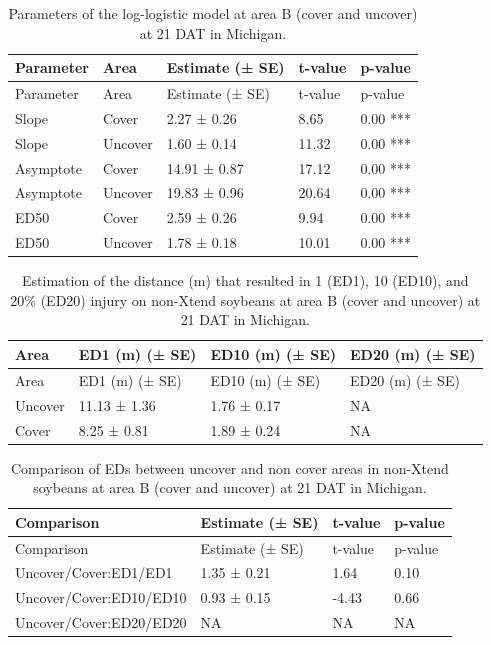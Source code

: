 \documentclass[]{article}
\begin{document}
\begin{longtable}[]{@{}lllll@{}}
\caption{Parameters of the log-logistic model at area B (cover and
uncover) at 21 DAT in Michigan.}\tabularnewline
\toprule
Parameter & Area & Estimate (± SE) & t-value & p-value\tabularnewline
\midrule
\endfirsthead
\toprule
Parameter & Area & Estimate (± SE) & t-value & p-value\tabularnewline
\midrule
\endhead
Slope & Cover & 2.27 ± 0.26 & 8.65 & 0.00 ***\tabularnewline
Slope & Uncover & 1.60 ± 0.14 & 11.32 & 0.00 ***\tabularnewline
Asymptote & Cover & 14.91 ± 0.87 & 17.12 & 0.00 ***\tabularnewline
Asymptote & Uncover & 19.83 ± 0.96 & 20.64 & 0.00 ***\tabularnewline
ED50 & Cover & 2.59 ± 0.26 & 9.94 & 0.00 ***\tabularnewline
ED50 & Uncover & 1.78 ± 0.18 & 10.01 & 0.00 ***\tabularnewline
\bottomrule
\end{longtable}

\begin{longtable}[]{@{}llll@{}}
\caption{Estimation of the distance (m) that resulted in 1 (ED1), 10
(ED10), and 20\% (ED20) injury on non-Xtend soybeans at area B (cover
and uncover) at 21 DAT in Michigan.}\tabularnewline
\toprule
Area & ED1 (m) (± SE) & ED10 (m) (± SE) & ED20 (m) (± SE)\tabularnewline
\midrule
\endfirsthead
\toprule
Area & ED1 (m) (± SE) & ED10 (m) (± SE) & ED20 (m) (± SE)\tabularnewline
\midrule
\endhead
Uncover & 11.13 ± 1.36 & 1.76 ± 0.17 & NA\tabularnewline
Cover & 8.25 ± 0.81 & 1.89 ± 0.24 & NA\tabularnewline
\bottomrule
\end{longtable}

\begin{longtable}[]{@{}llll@{}}
\caption{Comparison of EDs between uncover and non cover areas in
non-Xtend soybeans at area B (cover and uncover) at 21 DAT in
Michigan.}\tabularnewline
\toprule
Comparison & Estimate (± SE) & t-value & p-value\tabularnewline
\midrule
\endfirsthead
\toprule
Comparison & Estimate (± SE) & t-value & p-value\tabularnewline
\midrule
\endhead
Uncover/Cover:ED1/ED1 & 1.35 ± 0.21 & 1.64 & 0.10\tabularnewline
Uncover/Cover:ED10/ED10 & 0.93 ± 0.15 & -4.43 & 0.66\tabularnewline
Uncover/Cover:ED20/ED20 & NA & NA & NA\tabularnewline
\bottomrule
\end{longtable}
\end{document}
